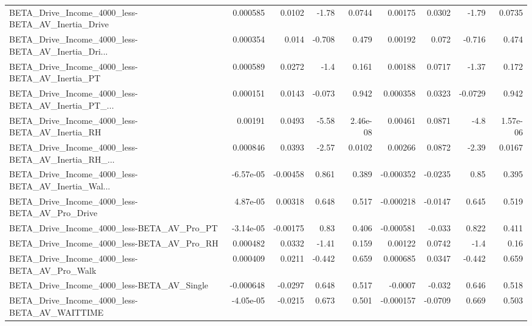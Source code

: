 \begin{tabular}{lrrrrrrrr}
BETA\_Drive\_Income\_4000\_less-BETA\_AV\_Inertia\_Drive  &    0.000585 &       0.0102 &    -1.78 &   0.0744 &    0.00175 &      0.0302 &        -1.79 &        0.0735 \\
BETA\_Drive\_Income\_4000\_less-BETA\_AV\_Inertia\_Dri... &    0.000354 &        0.014 &   -0.708 &    0.479 &    0.00192 &       0.072 &       -0.716 &         0.474 \\
BETA\_Drive\_Income\_4000\_less-BETA\_AV\_Inertia\_PT     &    0.000589 &       0.0272 &     -1.4 &    0.161 &    0.00188 &      0.0717 &        -1.37 &         0.172 \\
BETA\_Drive\_Income\_4000\_less-BETA\_AV\_Inertia\_PT\_... &    0.000151 &       0.0143 &   -0.073 &    0.942 &   0.000358 &      0.0323 &      -0.0729 &         0.942 \\
BETA\_Drive\_Income\_4000\_less-BETA\_AV\_Inertia\_RH     &     0.00191 &       0.0493 &    -5.58 & 2.46e-08 &    0.00461 &      0.0871 &         -4.8 &      1.57e-06 \\
BETA\_Drive\_Income\_4000\_less-BETA\_AV\_Inertia\_RH\_... &    0.000846 &       0.0393 &    -2.57 &   0.0102 &    0.00266 &      0.0872 &        -2.39 &        0.0167 \\
BETA\_Drive\_Income\_4000\_less-BETA\_AV\_Inertia\_Wal... &   -6.57e-05 &     -0.00458 &    0.861 &    0.389 &  -0.000352 &     -0.0235 &         0.85 &         0.395 \\
BETA\_Drive\_Income\_4000\_less-BETA\_AV\_Pro\_Drive      &    4.87e-05 &      0.00318 &    0.648 &    0.517 &  -0.000218 &     -0.0147 &        0.645 &         0.519 \\
BETA\_Drive\_Income\_4000\_less-BETA\_AV\_Pro\_PT         &   -3.14e-05 &     -0.00175 &     0.83 &    0.406 &  -0.000581 &      -0.033 &        0.822 &         0.411 \\
BETA\_Drive\_Income\_4000\_less-BETA\_AV\_Pro\_RH         &    0.000482 &       0.0332 &    -1.41 &    0.159 &    0.00122 &      0.0742 &         -1.4 &          0.16 \\
BETA\_Drive\_Income\_4000\_less-BETA\_AV\_Pro\_Walk       &    0.000409 &       0.0211 &   -0.442 &    0.659 &   0.000685 &      0.0347 &       -0.442 &         0.659 \\
BETA\_Drive\_Income\_4000\_less-BETA\_AV\_Single         &   -0.000648 &      -0.0297 &    0.648 &    0.517 &    -0.0007 &      -0.032 &        0.646 &         0.518 \\
BETA\_Drive\_Income\_4000\_less-BETA\_AV\_WAITTIME       &   -4.05e-05 &      -0.0215 &    0.673 &    0.501 &  -0.000157 &     -0.0709 &        0.669 &         0.503 \\

\end{tabular}
